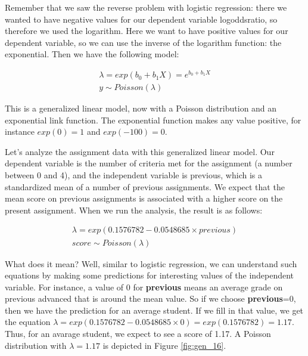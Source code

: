 \documentclass[]{report}\usepackage[]{graphicx}\usepackage[]{color}
\begin{document}
Remember that we saw the reverse problem with logistic regression: there we wanted to have negative values for our dependent variable logoddsratio, so therefore we used the logarithm. Here we want to have positive values for our dependent variable, so we can use the inverse of the logarithm function: the exponential. Then we have the following model:


\begin{eqnarray}
\lambda = exp(b_0 + b_1 X)= e^{b_0+b_1X} \\
y \sim Poisson(\lambda)
\end{eqnarray}


This is a generalized linear model, now with a Poisson distribution and an exponential link function. The exponential function makes any value positive, for instance $exp(0)=1$ and $exp(-100)=0$.

Let's analyze the assignment data with this generalized linear model. Our dependent variable is the number of criteria met for the assignment (a number between 0 and 4), and the independent variable is previous, which is a standardized mean of a number of previous assignments. We expect that the mean score on previous assignments is associated with a higher score on the present assignment. When we run the analysis, the result is as follows:


\begin{eqnarray}
\lambda = exp(0.1576782 -0.0548685 \times previous) \\
score \sim Poisson(\lambda)
\end{eqnarray}

What does it mean? Well, similar to logistic regression, we can understand such equations by making some predictions for interesting values of the independent variable. For instance, a value of 0 for \textbf{previous} means an average grade on previous advanced that is around the mean value. So if we choose \textbf{previous}=0, then we have the prediction for an average student. If we fill in that value, we get the equation $\lambda=exp(0.1576782 -0.0548685 \times 0)= exp (0.1576782)= 1.17$. Thus, for an avarage student, we expect to see a score of 1.17. A Poisson distribution with $\lambda=1.17$ is depicted in Figure \ref{fig:gen_16}.
\end{document}

